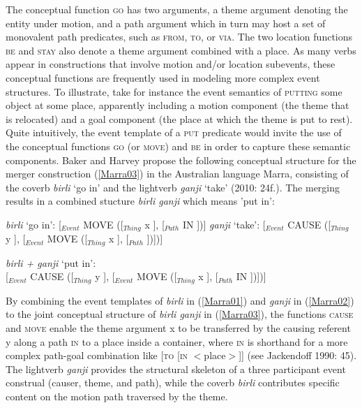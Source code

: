 \smallskip
{\scriptsize
\begin{avm}
\end{avm}
}

\bigskip
The conceptual function \textsc{go} has two arguments, a theme argument denoting the entity under motion, and a path argument which in turn may host a set of monovalent path predicates, such as \textsc{from}, \textsc{to}, or \textsc{via}. The two location functions \textsc{be} and \textsc{stay} also denote a theme argument combined with a place. As many verbs appear in constructions that involve motion and/or location subevents, these conceptual functions are frequently used in modeling more complex event structures. To illustrate, take for instance the event semantics of \textsc{putting} some object at some place, apparently including a motion component (the theme that is relocated) and a goal component (the place at which the theme is put to rest). Quite intuitively, the event template of a \textsc{put} predicate would invite the use of the conceptual functions \textsc{go} (or \textsc{move}) and \textsc{be} in order to capture these semantic components. Baker and Harvey propose the following conceptual structure for the merger construction (\ref{Marra03}) in the Australian language Marra, consisting of the coverb \textit{birli} `go in' and the lightverb \textit{ganji} `take' (2010: 24f.). The merging results in a combined stucture \textit{birli ganji} which means 'put in':

\ea \label{Marra01}
\textit{birli} `go in': {\small[$_{Event}$ MOVE ([$_{Thing}$ x ], [$_{Path}$ IN ])]}
\z
\ea \label{Marra02}
\textit{ganji} `take': {\small[$_{Event}$ CAUSE ([$_{Thing}$ y ], [$_{Event}$ MOVE ([$_{Thing}$ x ], [$_{Path}$ ])])]}
\z

\ea \label{Marra03}
\textit{birli + ganji} `put in': \\
{\small[$_{Event}$ CAUSE ([$_{Thing}$ y ], [$_{Event}$ MOVE ([$_{Thing}$ x ], [$_{Path}$ IN ])])]}
\z

By combining the event templates of \textit{birli} in (\ref{Marra01}) and \textit{ganji} in (\ref{Marra02}) to the joint conceptual structure of \textit{birli ganji} in (\ref{Marra03}), the functions \textsc{cause} and \textsc{move} enable the theme argument x to be transferred by the causing referent y along a path \textsc{in} to a place inside a container, where \textsc{in} is shorthand for a more complex path-goal combination like [\textsc{to} [\textsc{in} $<$place$>$]] (see Jackendoff 1990: 45). The lightverb \textit{ganji} provides the structural skeleton of a three participant event construal (causer, theme, and path), while the coverb \textit{birli} contributes specific content on the motion path traversed by the theme. 

